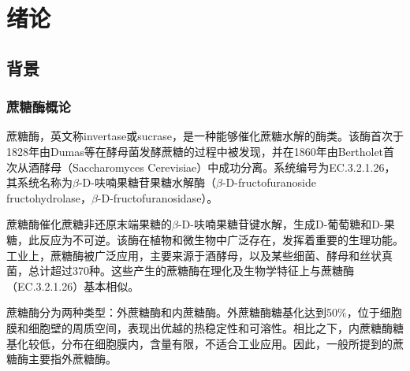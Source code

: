 \cleardoublepage

\section{绪论}
\subsection{背景}
\subsubsection{蔗糖酶概论}
蔗糖酶，英文称invertase或sucrase，是一种能够催化蔗糖水解的酶类。该酶首次于1828年由Dumas等在酵母菌发酵蔗糖的过程中被发现，并在1860年由Bertholet首次从酒酵母（Saccharomyces Cerevisiae）中成功分离。系统编号为EC.3.2.1.26，其系统名称为$\beta$-D-呋喃果糖苷果糖水解酶（$\beta$-D-fructofuranoside fructohydrolase，$\beta$-D-fructofuranosidase）。

蔗糖酶催化蔗糖非还原末端果糖的$\beta$-D-呋喃果糖苷键水解，生成D-葡萄糖和D-果糖，此反应为不可逆。该酶在植物和微生物中广泛存在，发挥着重要的生理功能。工业上，蔗糖酶被广泛应用，主要来源于酒酵母，以及某些细菌、酵母和丝状真菌，总计超过370种。这些产生的蔗糖酶在理化及生物学特征上与蔗糖酶（EC.3.2.1.26）基本相似。

蔗糖酶分为两种类型：外蔗糖酶和内蔗糖酶。外蔗糖酶糖基化达到50\%，位于细胞膜和细胞壁的周质空间，表现出优越的热稳定性和可溶性。相比之下，内蔗糖酶糖基化较低，分布在细胞膜内，含量有限，不适合工业应用。因此，一般所提到的蔗糖酶主要指外蔗糖酶。\cite{kulshrestha2013invertase}

